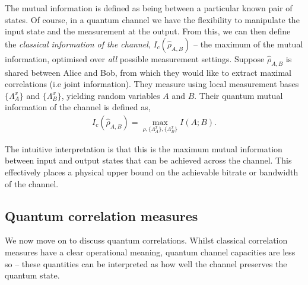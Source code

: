 The mutual information is defined as being between a particular known pair of states. Of course, in a quantum channel we have the flexibility to manipulate the input state and the measurement at the output. From this, we can then define the \textit{classical information of the channel}, $I_c(\hat\rho_{A,B})$ -- the maximum of the mutual information, optimised over \textit{all} possible measurement settings. Suppose $\hat\rho_{A,B}$ is shared between Alice and Bob, from which they would like to extract maximal correlations (i.e joint information). They measure using local measurement bases $\{\Lambda_A^x\}$ and $\{\Lambda_B^x\}$, yielding random variables $A$ and $B$. Their quantum mutual information of the channel is defined as,
\begin{align}
I_c(\hat\rho_{A,B}) = \max_{\rho,\{\Lambda_A^x\},\{\Lambda_B^x\}} I(A;B). \label{eq:quant_mut}
\end{align}

The intuitive interpretation is that this is the maximum mutual information between input and output states that can be achieved across the channel. This effectively places a physical upper bound on the achievable bitrate or bandwidth of the channel.


\subsection{Quantum correlation measures}

We now move on to discuss quantum correlations. Whilst classical correlation measures have a clear operational meaning, quantum channel capacities are less so -- these quantities can be interpreted as how well the channel preserves the quantum state.

